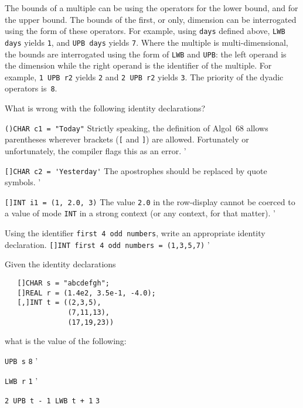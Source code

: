 The bounds of a multiple can be
 using the operators
 for the lower bound, and  for the upper bound.
The bounds of the first, or only, dimension can be interrogated using
the  form of these operators.  For
example, using \verb|days| defined above, \verb|LWB days| yields
\verb|1|, and \verb|UPB days| yields \verb|7|. Where the multiple is
multi-dimensional, the bounds are interrogated using the
 form of \verb|LWB| and \verb|UPB|: the
left operand is the dimension while the right operand is the
identifier of the multiple.  For example, \verb|1 UPB r2| yields
\verb|2| and \verb|2 UPB r2| yields \verb|3|.  The priority of the
dyadic operators is~\verb|8|.

\begin{exercise}
\item What is wrong with the following identity declarations?
\begin{subex}
\item \verb|()CHAR c1 = "Today"| \subans Strictly speaking, the
definition of Algol~68 allows parentheses wherever brackets (\verb|[|
and \verb|]|) are allowed. Fortunately or unfortunately, the
 compiler flags this as an error.
'
\item \verb|[]CHAR c2 = 'Yesterday'| \subans The apostrophes should
be replaced by quote symbols.
'
\item \verb|[]INT i1 = (1, 2.0, 3)| \subans The value \verb|2.0| in
the row-display cannot be coerced to a value of mode \verb|INT| in a
strong context (or any context, for that matter).
'
\end{subex}
\item Using the identifier \verb|first 4 odd numbers|, write an
appropriate identity declaration.
\ans \verb|[]INT first 4 odd numbers = (1,3,5,7)|
'
\item Given the identity declarations
\begin{verbatim}
   []CHAR s = "abcdefgh";
   []REAL r = (1.4e2, 3.5e-1, -4.0);
   [,]INT t = ((2,3,5),
               (7,11,13),
               (17,19,23))
\end{verbatim}
\noindent
what is the value of the following:
\begin{subex}
\item \verb|UPB s| \subans \verb|8|
'
\item \verb|LWB r| \subans \verb|1|
'
\item \verb|2 UPB t - 1 LWB t + 1| \subans \verb|3|

\end{subex}
\end{exercise}
